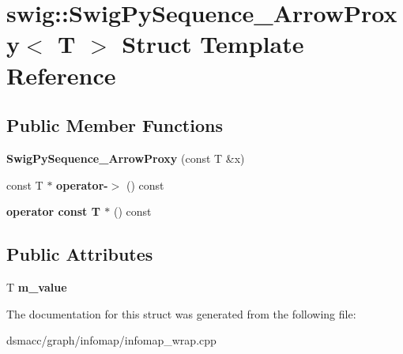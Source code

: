 \hypertarget{structswig_1_1SwigPySequence__ArrowProxy}{}\section{swig\+:\+:Swig\+Py\+Sequence\+\_\+\+Arrow\+Proxy$<$ T $>$ Struct Template Reference}
\label{structswig_1_1SwigPySequence__ArrowProxy}
\subsection*{Public Member Functions}
\begin{DoxyCompactItemize}
\item 
\mbox{\label{structswig_1_1SwigPySequence__ArrowProxy_a28b1117f7ac65b3ec51101215306a9d9}} 
{\bfseries Swig\+Py\+Sequence\+\_\+\+Arrow\+Proxy} (const T \&x)
\item 
\mbox{\label{structswig_1_1SwigPySequence__ArrowProxy_a8f9c6d4d0feb5cf17f8cb06e30f5721e}} 
const T $\ast$ {\bfseries operator-\/$>$} () const
\item 
\mbox{\label{structswig_1_1SwigPySequence__ArrowProxy_a6e0e0a0f3bb533b48aa05bd94165929b}} 
{\bfseries operator const T $\ast$} () const
\end{DoxyCompactItemize}
\subsection*{Public Attributes}
\begin{DoxyCompactItemize}
\item 
\mbox{\label{structswig_1_1SwigPySequence__ArrowProxy_a7e68416553925e7556e737325c324e0f}} 
T {\bfseries m\+\_\+value}
\end{DoxyCompactItemize}


The documentation for this struct was generated from the following file\+:\begin{DoxyCompactItemize}
\item 
dsmacc/graph/infomap/infomap\+\_\+wrap.\+cpp\end{DoxyCompactItemize}
